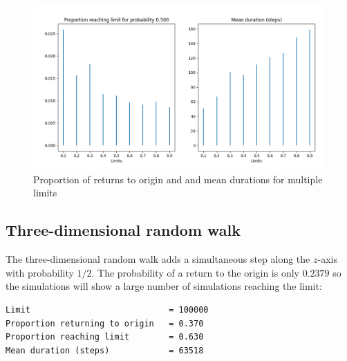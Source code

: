 \begin{figure}
\begin{center}
\includegraphics[width=\textwidth]{random-walk-02}
\caption{Proportion of returns to origin and and mean durations for multiple limits}\label{f.random-walk-2D}
\end{center}
\end{figure}

\newpage

\subsection{Three-dimensional random walk}

The three-dimensional random walk adds a simultaneous step along the $z$-axis with probability $1/2$. The probability of a return to the origin is only $0.2379$ so the simulations will show a large number of simulations reaching the limit:

\begin{verbatim}
Limit                            = 100000
Proportion returning to origin   = 0.370
Proportion reaching limit        = 0.630
Mean duration (steps)            = 63518
\end{verbatim}

